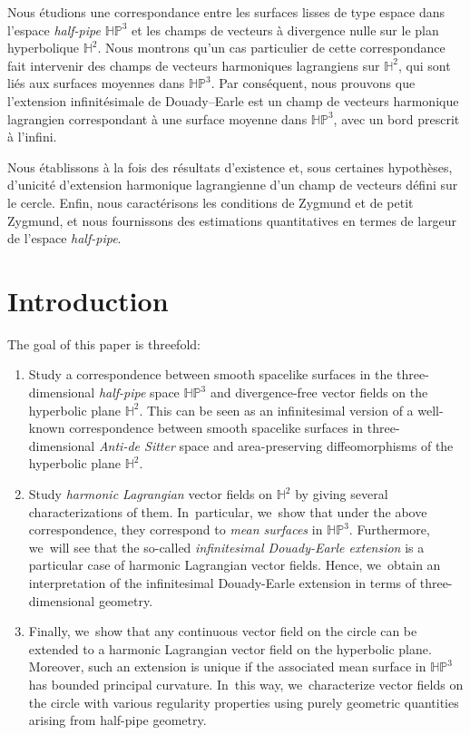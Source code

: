 \documentclass[JEP,XML,SOM,Unicode,NoEqCountersInSection, NoFloatCountersInSection,published]{cedram}
\theoremstyle{plain}
\theoremstyle{definition}
\newcommand{\HP}{\mathbb{HP}^3}
\begin{document}
\begin{altabstract}
Nous étudions une correspondance entre les surfaces lisses de type espace dans l'espace \emph{half-pipe} $\mathbb{HP}^3$ et les champs de vecteurs à divergence nulle sur le plan hyperbolique $\mathbb{H}^2$. Nous montrons qu'un cas particulier de cette correspondance fait intervenir des champs de vecteurs harmoniques lagrangiens sur $\mathbb{H}^2$, qui sont liés aux surfaces moyennes dans $\mathbb{HP}^3$. Par conséquent, nous prouvons que l'extension infinitésimale de Douady–Earle est un champ de vecteurs harmo\-nique lagrangien correspondant à une surface moyenne dans $\mathbb{HP}^3$, avec un bord prescrit à l'infini. 

Nous établissons à la fois des résultats d'existence et, sous certaines hypothèses, d'unicité d'extension harmonique lagrangienne d'un champ de vecteurs défini sur le cercle. Enfin, nous caractérisons les conditions de Zygmund et de petit Zygmund, et nous fournissons des estimations quantitatives en termes de largeur de l'espace \emph{half-pipe}.\end{altabstract}

\maketitle
\vspace*{-\baselineskip}
\tableofcontents

\mainmatter
\section{Introduction}
The goal of this paper is threefold:
\begin{enumerate}
\item Study a correspondence between smooth spacelike surfaces in the three-dimensional \emph{half-pipe} space $\HP$ and divergence-free vector fields on the hyperbolic plane $\mathbb{H}^2$. This can be seen as an infinitesimal version of a well-known correspondence between smooth spacelike surfaces in three-dimensional \emph{Anti-de Sitter} space and area-preserving diffeomorphisms of the hyperbolic plane $\mathbb{H}^2$.
\item Study \emph{harmonic Lagrangian} vector fields on $\mathbb{H}^2$ by giving several characterizations of them. In~particular, we~show that under the above correspondence, they correspond to \emph{mean surfaces} in $\HP$. Furthermore, we~will see that the so-called \emph{infinitesimal Douady-Earle extension} is a particular case of harmonic Lagrangian vector fields. Hence, we~obtain an interpretation of the infinitesimal Douady-Earle extension in terms of three-dimensional geometry.
\item Finally, we~show that any continuous vector field on the circle can be extended to a harmonic Lagrangian vector field on the hyperbolic plane. Moreover, such an extension is unique if the associated mean surface in \(\HP\) has bounded principal curvature. In~this way, we~characterize vector fields on the circle with various regularity properties using purely geometric quantities arising from half-pipe geometry.
\end{enumerate}
\end{document}
